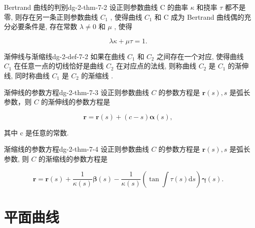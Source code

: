 \begin{theorem}{Bertrand 曲线的判别}{dg-2-thm-7-2}
设正则参数曲线 C 的曲率  \(\kappa\)  和挠率  \(\tau\)  都不是零, 则存在另一条正则参数曲线  \(C_{1}\) , 使得曲线  \(C_{1}\)  和 C 成为 Bertrand 曲线偶的充分必要条件是, 存在常数  \(\lambda \neq 0\)  和  \(\mu\) , 使得\par

\[
\lambda \kappa + \mu \tau = 1.
\]
\end{theorem}

\begin{definition}{渐伸线与渐缩线}{dg-2-def-7-2}
如果在曲线  \(C_{1}\)  和  \(C_{2}\)  之间存在一个对应, 使得曲线  \(C_{1}\)  在任意一点的切线恰好是曲线  \(C_{2}\)  在对应点的法线, 则称曲线  \(C_{2}\)  是  \(C_{1}\)  的渐伸线, 同时称曲线  \(C_{1}\)  是  \(C_{2}\)  的渐缩线 .
\end{definition}

\begin{theorem}{渐伸线的参数方程}{dg-2-thm-7-3}
设正则参数曲线 \(C\) 的参数方程是 \(\boldsymbol{r}(s), s\) 是弧长参数，则 \(C\) 的渐伸线的参数方程是\par

\begin{equation*}
\boldsymbol {r} = \boldsymbol {r} (s) + (c - s) \boldsymbol {\alpha} (s),
\end{equation*}

其中 c 是任意的常数.
\end{theorem}

\begin{theorem}{渐缩线的参数方程}{dg-2-thm-7-4}
设正则参数曲线 \(C\) 的参数方程是 \(\boldsymbol{r}(s), s\) 是弧长参数, 则 \(C\) 的渐缩线的参数方程是\par

\begin{equation*}
\boldsymbol {r} = \boldsymbol {r} (s) + \frac {1}{\kappa (s)} \boldsymbol {\beta} (s) - \frac {1}{\kappa (s)} \left(\tan \int \tau (s) \mathrm{d} s\right) \boldsymbol {\gamma} (s).
\end{equation*}
\end{theorem}

\section{平面曲线}

